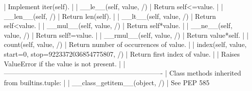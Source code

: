 \documentclass{article}
\begin{document}
     |      Implement iter(self).
     |
     |  __le__(self, value, /)
     |      Return self<=value.
     |
     |  __len__(self, /)
     |      Return len(self).
     |
     |  __lt__(self, value, /)
     |      Return self<value.
     |
     |  __mul__(self, value, /)
     |      Return self*value.
     |
     |  __ne__(self, value, /)
     |      Return self!=value.
     |
     |  __rmul__(self, value, /)
     |      Return value*self.
     |
     |  count(self, value, /)
     |      Return number of occurrences of value.
     |
     |  index(self, value, start=0, stop=9223372036854775807, /)
     |      Return first index of value.
     |
     |      Raises ValueError if the value is not present.
     |
     |  ----------------------------------------------------------------------
     |  Class methods inherited from builtins.tuple:
     |
     |  __class_getitem__(object, /)
     |      See PEP 585
\end{document}
